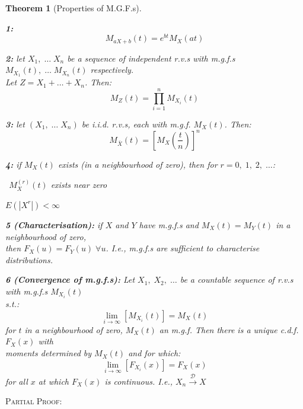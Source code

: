 \documentclass[12pt,a4paper]{article}
\newtheorem{thm}{Theorem}[subsection]
\begin{document}
\begin{thm}[Properties of M.G.F.s]\label{mgf properties}\vspace{1cm}

{\bf 1: }
$$M_{aX+b}(t) = e^{bt}M_X(at)$$\par\vspace{1cm}

{\bf 2: } let $X_1,\;\hdots\;X_n$ be a sequence of independent r.v.s with m.g.f.s $M_{X_1}(t),\;\hdots\;M_{X_n}(t)$ respectively.\\ \indent\indent Let $Z= X_1 + \hdots + X_n$. Then:
$$M_Z(t) = \prod_{i=1}^n M_{X_i}(t)$$\par\vspace{1cm}

{\bf 3: } let $(X_1,\;\hdots\;X_n)$ be i.i.d. r.v.s, each with m.g.f. $M_X(t)$. Then:
$$M_{\bar{X}}(t) = \left[M_X\left(\frac{t}{n}\right)\right]^n$$\par\vspace{1cm}

{\bf 4: } if $M_X(t)$ exists (in a neighbourhood of zero), then for $r=0,\;1,\;2,\;\hdots$:\par
\indent{}  $\;\,M_X^{(r)}(t)$ exists near zero\par
\indent{}  $E\left(\left|X^r\right|\right) < \infty$\par

{\bf 5 (Characterisation): } if $X$ and $Y$ have m.g.f.s and $M_X(t) = M_Y(t)$ in a neighbourhood of zero,\\ \indent\indent then $F_X(u) = F_Y(u)\;\forall u$. I.e., m.g.f.s are sufficient to characterise distributions.\par\vspace{1cm}

{\bf 6 (Convergence of m.g.f.s): } Let $X_1,\;X_2,\;\hdots$ be a countable sequence of r.v.s with m.g.f.s $M_{X_i}(t)$\\ \indent\indent s.t.:
$$\lim_{i\to\infty}\left[M_{X_i}(t)\right] = M_X(t)$$
\indent\indent for $t$ in a neighbourhood of zero, $M_X(t)$ an m.g.f. Then there is a unique c.d.f. $F_X(x)$ with\\ \indent\indent moments determined by $M_X(t)$ and for which:
$$\lim_{i\to\infty}\left[F_{X_i}(x)\right] = F_X(x)$$
\indent\indent for all $x$ at which $F_X(x)$ is continuous. I.e., $X_n\xrightarrow{\mathscr{D}}X$

\end{thm}

\noindent\textsc{Partial Proof:}\par\vspace{1cm}
\end{document}

